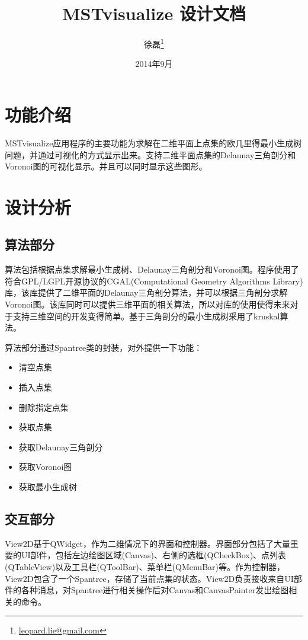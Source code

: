 \documentclass[12pt]{article}
\begin{document}
\title{MSTvisualize 设计文档}

\author{徐磊\thanks{\href{mailto:leopard.lie@gmail.com}{leopard.lie@gmail.com}}}

\date{2014年9月}
\maketitle

\section{功能介绍}
MSTvisualize应用程序的主要功能为求解在二维平面上点集的欧几里得最小生成树问题，并通过可视化的方式显示出来。支持二维平面点集的Delaunay三角剖分和Voronoi图的可视化显示。并且可以同时显示这些图形。

\section{设计分析}
\subsection{算法部分}
算法包括根据点集求解最小生成树、Delaunay三角剖分和Voronoi图。程序使用了符合GPL/LGPL开源协议的CGAL(Computational Geometry Algorithms Library)库，该库提供了二维平面的Delaunay三角剖分算法，并可以根据三角剖分求解Voronoi图。该库同时可以提供三维平面的相关算法，所以对库的使用使得未来对于支持三维空间的开发变得简单。基于三角剖分的最小生成树采用了kruskal算法。

算法部分通过Spantree类的封装，对外提供一下功能：
\begin{itemize}
\item 清空点集
\item 插入点集
\item 删除指定点集
\item 获取点集
\item 获取Delaunay三角剖分
\item 获取Voronoi图
\item 获取最小生成树
\end{itemize}

\subsection{交互部分}
View2D基于QWidget，作为二维情况下的界面和控制器。界面部分包括了大量重要的UI部件，包括左边绘图区域(Canvas)、右侧的选框(QCheckBox)、点列表(QTableView)以及工具栏(QToolBar)、菜单栏(QMenuBar)等。作为控制器，View2D包含了一个Spantree，存储了当前点集的状态。View2D负责接收来自UI部件的各种消息，对Spantree进行相关操作后对Canvas和CanvasPainter发出绘图相关的命令。
\end{document}
